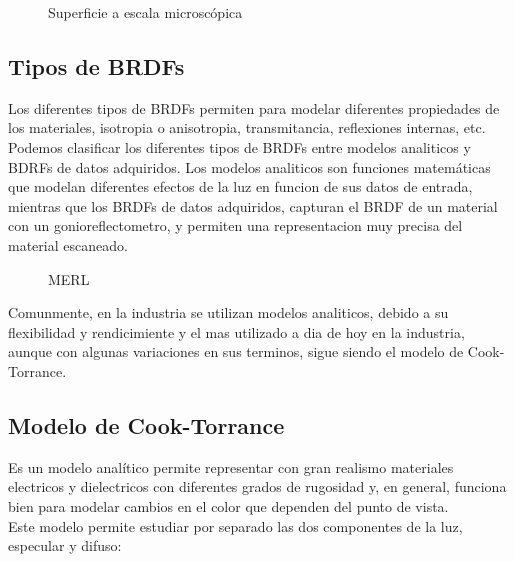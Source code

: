         \begin{figure}[H]
            \vspace{0.5cm}
            \centering
            \caption{Superficie a escala microsc\'opica}
            \vspace{1.0cm}
        \end{figure}

    \egroup


    \subsection{Tipos de BRDFs}
    Los diferentes tipos de BRDFs permiten para modelar diferentes propiedades de los materiales, isotropia o anisotropia,
    transmitancia, reflexiones internas, etc. Podemos clasificar los diferentes tipos de BRDFs entre modelos analiticos y BDRFs
    de datos adquiridos. Los modelos analiticos son funciones matemáticas que modelan diferentes efectos de la luz en funcion de
    sus datos de entrada, mientras que los BRDFs de datos adquiridos, capturan el BRDF de un material con un gonioreflectometro,
    y permiten una representacion muy precisa del material escaneado.

    \begin{figure}[H]
        \vspace{0.5cm}
        \centering
        \caption{MERL}
        \vspace{0.5cm}
    \end{figure}

    Comunmente, en la industria se utilizan modelos analiticos, debido a su flexibilidad y rendicimiente y el mas utilizado a
    dia de hoy en la industria, aunque con algunas variaciones en sus terminos, sigue siendo el modelo de Cook-Torrance.

    \subsection{Modelo de Cook-Torrance}
        Es un modelo anal\'itico permite representar con gran realismo materiales electricos y dielectricos con diferentes
        grados de rugosidad y, en general, funciona bien para modelar cambios en el color que dependen del punto de vista.\\
        Este modelo permite estudiar por separado las dos componentes de la luz, especular y difuso:

